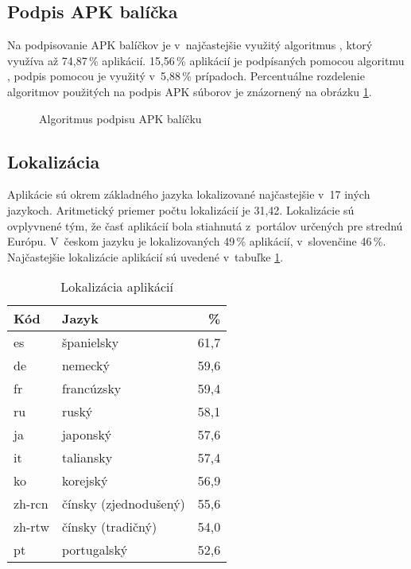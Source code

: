 \subsection*{Podpis APK balíčka}
Na podpisovanie APK balíčkov je v~najčastejšie využitý algoritmus , ktorý využíva až 74,87\,\% aplikácií. 15,56\,\% aplikácií je podpísaných pomocou algoritmu , podpis pomocou  je využitý v~5,88\,\% prípadoch. Percentuálne rozdelenie algoritmov použitých na podpis APK súborov je znázornený na obrázku \ref{fig:signAlg}.


\begin{figure}[htb]
\centering
{}
\caption{Algoritmus podpisu APK balíčku}
\label{fig:signAlg}
\end{figure}

\subsection*{Lokalizácia}
Aplikácie sú okrem základného jazyka lokalizované najčastejšie v~17 iných jazykoch. Aritmetický priemer počtu lokalizácií je 31,42. Lokalizácie sú ovplyvnené tým, že časť aplikácií bola stiahnutá z~portálov určených pre strednú Európu. V~českom jazyku je lokalizovaných 49\,\% aplikácií, v~slovenčine 46\,\%. Najčastejšie lokalizácie aplikácií sú uvedené v~tabuľke \ref{tab:language}.
\begin{table}[htb]
\centering
  \begin{tabular}{|l l r|}
    \hline
    \textbf{Kód} & \textbf{Jazyk} &  \textbf{\%} \\\hline\hline
    es & španielsky & 61,7 \\
    de & nemecký & 59,6 \\
    fr & francúzsky & 59,4 \\
    ru & ruský & 58,1 \\
    ja & japonský & 57,6 \\
    it & taliansky & 57,4 \\
	ko & korejský & 56,9 \\
	zh-rcn & čínsky (zjednodušený) & 55,6\\
	zh-rtw & čínsky (tradičný)& 54,0\\
	pt & portugalský & 52,6\\
    \hline
  \end{tabular}
  \caption{Lokalizácia aplikácií}
  \label{tab:language}
\end{table}

